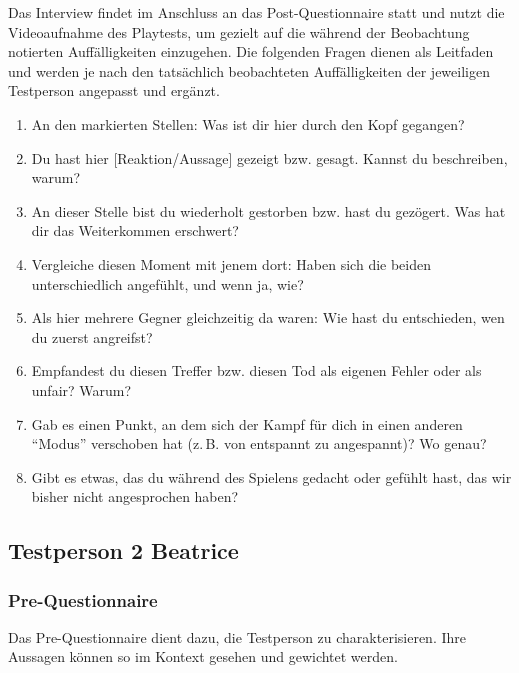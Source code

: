 \documentclass[../Main.tex]{subfiles}
\begin{document}
Das Interview findet im Anschluss an das Post-Questionnaire statt und nutzt die Videoaufnahme des Playtests, um gezielt auf die während der Beobachtung notierten Auffälligkeiten einzugehen. Die folgenden Fragen dienen als Leitfaden und werden je nach den tatsächlich beobachteten Auffälligkeiten der jeweiligen Testperson angepasst und ergänzt.

\begin{enumerate}[label=\textbf{I\arabic*}, leftmargin=1.5cm, itemsep=0.5em]
    \item An den markierten Stellen: Was ist dir hier durch den Kopf gegangen?
    \item Du hast hier [Reaktion/Aussage] gezeigt bzw. gesagt. Kannst du beschreiben, warum?
    \item An dieser Stelle bist du wiederholt gestorben bzw. hast du gezögert. Was hat dir das Weiterkommen erschwert?
    \item Vergleiche diesen Moment mit jenem dort: Haben sich die beiden unterschiedlich angefühlt, und wenn ja, wie?
    \item Als hier mehrere Gegner gleichzeitig da waren: Wie hast du entschieden, wen du zuerst angreifst?
    \item Empfandest du diesen Treffer bzw. diesen Tod als eigenen Fehler oder als unfair? Warum?
    \item Gab es einen Punkt, an dem sich der Kampf für dich in einen anderen \enquote{Modus} verschoben hat (z.\,B. von entspannt zu angespannt)? Wo genau?
    \item Gibt es etwas, das du während des Spielens gedacht oder gefühlt hast, das wir bisher nicht angesprochen haben?
\end{enumerate}

\subsection{Testperson 2 Beatrice}

\subsubsection{Pre-Questionnaire}

Das Pre-Questionnaire dient dazu, die Testperson zu charakterisieren. Ihre Aussagen können so im Kontext gesehen und gewichtet werden.
\end{document}
